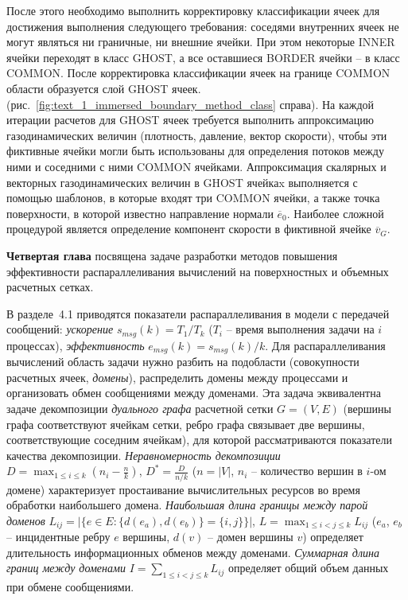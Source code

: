 \documentclass[a4paper,14pt]{extarticle}                     %
\theoremstyle{plain}                                         %
\begin{document}
После этого необходимо выполнить корректировку классификации ячеек для достижения выполнения следующего требования: соседями внутренних ячеек не могут являться ни граничные, ни внешние ячейки.
При этом некоторые INNER ячейки переходят в класс GHOST, а все оставшиеся BORDER ячейки -- в класс COMMON.
После корректировка классификации ячеек на границе COMMON области образуется слой GHOST ячеек. (рис.~\ref{fig:text_1_immersed_boundary_method_class} справа).
На каждой итерации расчетов для GHOST ячеек требуется выполнить аппроксимацию газодинамических величин (плотность, давление, вектор скорости), чтобы эти фиктивные ячейки могли быть использованы для определения потоков между ними и соседними с ними COMMON ячейками.
Аппроксимация скалярных и векторных газодинамических величин в GHOST ячейкаx выполняется с помощью шаблонов, в которые входят три COMMON ячейки, а также точка поверхности, в которой известно направление нормали $\overline{e}_0$.
Наиболее сложной процедурой является определение компонент скорости в фиктивной ячейке $\overline{v}_G$.


\newpage
\textbf{Четвертая глава} посвящена задаче разработки методов повышения эффективности распараллеливания вычислений на поверхностных и объемных расчетных сетках.


В разделе~4.1 приводятся показатели распараллеливания в модели с передачей сообщений: \textit{ускорение} $s_{msg}(k) = T_1/T_k$ ($T_i$ -- время выполнения задачи на $i$ процессах), \textit{эффективность} $e_{msg}(k) = s_{msg}(k)/k$.
Для распараллеливания вычислений область задачи нужно разбить на подобласти (совокупности расчетных ячеек, \textit{домены}), распределить домены между процессами и организовать обмен сообщениями между доменами.
Эта задача эквивалентна задаче декомпозиции \textit{дуального графа} расчетной сетки $G = (V, E)$ (вершины графа соответствуют ячейкам сетки, ребро графа связывает две вершины, соответствующие соседним ячейкам), для которой рассматриваются показатели качества декомпозиции.
\textit{Неравномерность декомпозиции} $D = \max_{1 \le i \le k}{ \left( n_i - \frac{n}{k} \right) }$, $D^{*} = \frac{D}{n/k}$ ($n = |V|$, $n_i$ -- количество вершин в $i$-ом домене) характеризует простаивание вычислительных ресурсов во время обработки наибольшего домена.
\textit{Наибольшая длина границы между парой доменов} $L_{ij} = \left| \{ e \in E: \{ d(e_a), d(e_b) \} = \{ i, j \} \} \right|$, $L = \max_{1 \le i < j \le k}{L_{ij}}$ ($e_a$, $e_b$ -- инцидентные ребру $e$ вершины, $d(v)$ -- домен вершины $v$) определяет длительность информационных обменов между доменами.
\textit{Суммарная длина границ между доменами} $I = \sum_{1 \le i < j \le k}{L_{ij}}$ определяет общий объем данных при обмене сообщениями.
\end{document}

